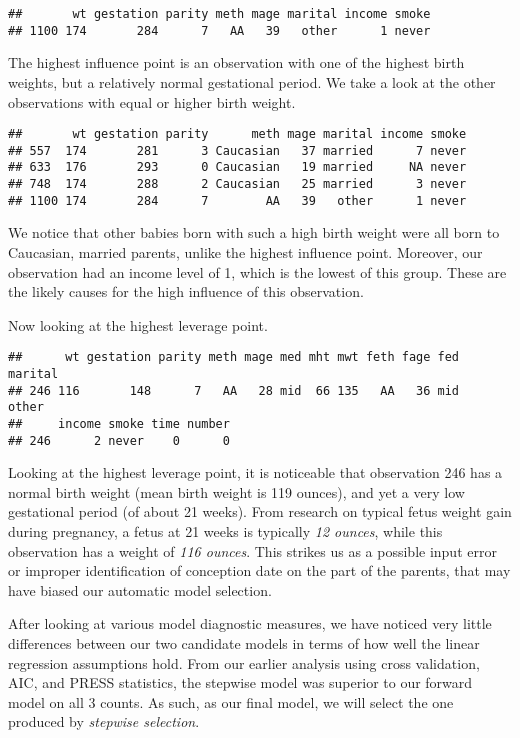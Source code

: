 \documentclass[]{article}
\begin{document}
\begin{verbatim}
##       wt gestation parity meth mage marital income smoke
## 1100 174       284      7   AA   39   other      1 never
\end{verbatim}

The highest influence point is an observation with one of the highest
birth weights, but a relatively normal gestational period. We take a
look at the other observations with equal or higher birth weight.

\begin{verbatim}
##       wt gestation parity      meth mage marital income smoke
## 557  174       281      3 Caucasian   37 married      7 never
## 633  176       293      0 Caucasian   19 married     NA never
## 748  174       288      2 Caucasian   25 married      3 never
## 1100 174       284      7        AA   39   other      1 never
\end{verbatim}

We notice that other babies born with such a high birth weight were all
born to Caucasian, married parents, unlike the highest influence point.
Moreover, our observation had an income level of 1, which is the lowest
of this group. These are the likely causes for the high influence of
this observation.

Now looking at the highest leverage point.

\begin{verbatim}
##      wt gestation parity meth mage med mht mwt feth fage fed marital
## 246 116       148      7   AA   28 mid  66 135   AA   36 mid   other
##     income smoke time number
## 246      2 never    0      0
\end{verbatim}

Looking at the highest leverage point, it is noticeable that observation
246 has a normal birth weight (mean birth weight is 119 ounces), and yet
a very low gestational period (of about 21 weeks). From research on
typical fetus weight gain during pregnancy, a fetus at 21 weeks is
typically \emph{12 ounces}, while this observation has a weight of
\emph{116 ounces}. This strikes us as a possible input error or improper
identification of conception date on the part of the parents, that may
have biased our automatic model selection.

After looking at various model diagnostic measures, we have noticed very
little differences between our two candidate models in terms of how well
the linear regression assumptions hold. From our earlier analysis using
cross validation, AIC, and PRESS statistics, the stepwise model was
superior to our forward model on all 3 counts. As such, as our final
model, we will select the one produced by \emph{stepwise selection}.
\end{document}
